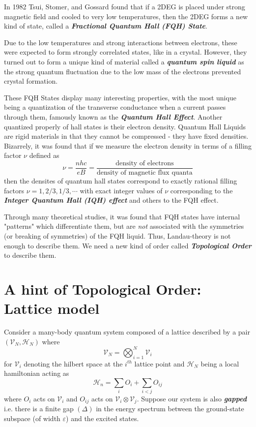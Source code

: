 \documentclass[11pt]{article}
\begin{document}
\vskip 0.5cm 
In 1982 Tsui, Stomer, and Gossard found that if a 2DEG is placed under strong magnetic field and cooled to very low temperatures, then the 2DEG forms a new kind of state, called a \emph{\textbf{Fractional Quantum Hall (FQH) State}}.

\vskip 0.5cm Due to the low temperatures and strong interactions between electrons, these were expected to form strongly correlated states, like in a crystal. However, they turned out to form a unique kind of material called a \emph{\textbf{quantum spin liquid}} as the strong quantum fluctuation due to the low mass of the electrons prevented crystal formation.

\vskip 0.5cm 
These FQH States display many interesting properties, with the most unique being a quantization of the transverse conductance when a current passes through them, famously known as the \textbf{\emph{Quantum Hall Effect}}. Another quantized properly of hall states is their electron density. Quantum Hall Liquids are rigid materials in that they cannot be compressed - they have fixed densities. Bizarrely, it was found that if we measure the electron density in terms of a filling factor $\nu$ defined as 
\[ \nu = \frac{nhc}{eB} = \frac{\text{density of electrons}}{\text{density of magnetic flux quanta}} \]
then the densites of quantum hall states correspond to exactly rational filling factors $\nu = 1, 2/3, 1/3, \cdots$ with exact integer values of $\nu$ corresponding to the \emph{\textbf{Integer Quantum Hall (IQH) effect}} and others to the FQH effect.

\vskip 0.5cm 
Through many theoretical studies, it was found that FQH states have internal "patterns" which differentiate them, but are \emph{not} associated with the symmetries (or breaking of symmetries) of the FQH liquid. Thus, Landau-theory is not enough to describe them. We need a new kind of order called \emph{\textbf{Topological Order}} to describe them.

\vskip 0.5cm
\section{A hint of Topological Order: Lattice model}

Consider a many-body quantum system composed of a lattice described by a pair $(\mathcal{V}_N, \mathcal{H}_N)$ where
\[ \mathcal{V}_N = \bigotimes_{i = 1}^N \mathcal{V}_i \]
for $\mathcal{V}_i$ denoting the hilbert space at the $i^{th}$ lattice point and $\mathcal{H}_N$ being a local hamiltonian acting as 
\[  \mathcal{H}_n = \sum_{i} O_i + \sum_{i < j} O_{ij}  \]
where $O_i$ acts on $\mathcal{V}_i$ and $O_{ij}$ acts on $\mathcal{V}_i \otimes \mathcal{V}_j$. Suppose our system is also \emph{\textbf{gapped}} i.e. there is a finite gap $(\Delta)$ in the energy spectrum between the ground-state subspace (of width $\varepsilon$) and the excited states. 
\end{document}
